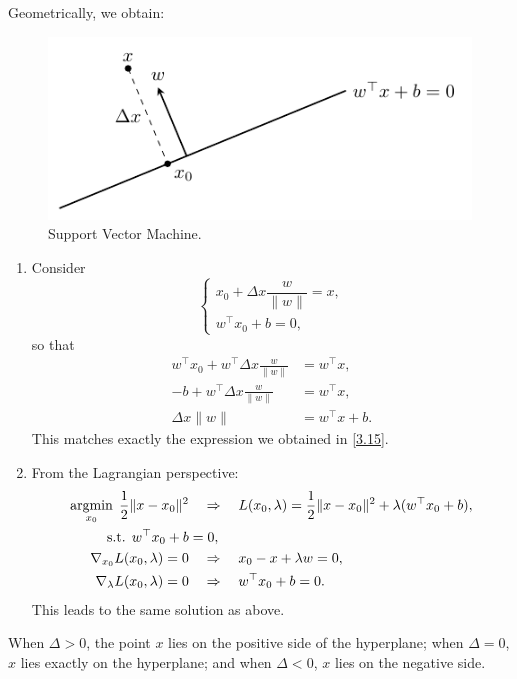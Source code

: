 \documentclass[../main]{subfiles}
\begin{document}
Geometrically, we obtain:

\begin{figure}[H]
    \centering
    \includegraphics{../../tikz/3/1.pdf}
    \caption{Support Vector Machine.}
    \label{2-lr}
\end{figure}

\begin{enumerate}
    \item Consider
    \[
        \begin{cases}
            x_0 + \Delta x \dfrac{w}{\|w\|} = x, \\
            w^\top x_0 + b = 0,
        \end{cases}
    \]
    so that
    \begin{align*}
        w^\top x_0 + w^\top \Delta x \frac{w}{\|w\|} &= w^\top x, \\
        -b + w^\top \Delta x \frac{w}{\|w\|} &= w^\top x, \\
        \Delta x \|w\| &= w^\top x + b.
    \end{align*}
    This matches exactly the expression we obtained in \eqref{3.15}.
    
    \item From the Lagrangian perspective:
    \begin{align*}
        \mathop{\mathrm{argmin}}_{x_0}\; \frac{1}{2}\|x - x_0\|^2 
        &\quad\Rightarrow\quad 
        L(x_0,\lambda) = \frac{1}{2}\|x - x_0\|^2 + \lambda (w^\top x_0 + b), \\
        \text{s.t. } w^\top x_0 + b &= 0, \\
        \nabla_{x_0} L(x_0, \lambda) = 0 
        &\quad\Rightarrow\quad x_0 - x + \lambda w = 0, \\
        \nabla_\lambda L(x_0, \lambda) = 0 
        &\quad\Rightarrow\quad w^\top x_0 + b = 0.
    \end{align*}
    This leads to the same solution as above.
\end{enumerate}
When $\Delta > 0$, the point $x$ lies on the positive side of the hyperplane;  
when $\Delta = 0$, $x$ lies exactly on the hyperplane;  
and when $\Delta < 0$, $x$ lies on the negative side.  
\end{document}
